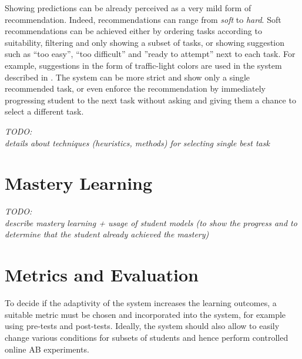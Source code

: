 Showing predictions can be already perceived as a very mild form of recommendation.
Indeed, recommendations can range from \emph{soft} to \emph{hard}.
Soft recommendations can be achieved either by
  ordering tasks according to suitability,
  filtering and only showing a subset of tasks,
  or showing suggestion such as
  ``too easy'', ``too difficult'' and ''ready to attempt'' next to each task.
For example, suggestions in the form of traffic-light colors
  are used in the system described in \cite{its-programming}.
The system can be more strict and show only a single recommended task,
  or even enforce the recommendation by immediately progressing student to
  the next task without asking and giving them a chance to select a different task.

\bigskip
\emph{TODO:\\details about techniques (heuristics, methods) for selecting single best task}


\section{Mastery Learning}
\label{sec:mastery-learning}

\emph{TODO:\\describe mastery learning + usage of student models%
(to show the progress and to determine that the student already achieved the mastery)}



\section{Metrics and Evaluation}
\label{sec:metrics-and-evaluation}

To decide if the adaptivity of the system increases the learning outcomes,
  a suitable metric must be chosen and incorporated into the system,
  for example using pre-tests and post-tests.
Ideally, the system should also allow to easily change various conditions
  for subsets of students and hence perform controlled online AB experiments.



